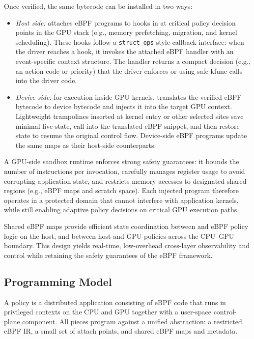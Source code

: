 Once verified, the same bytecode can be installed in two ways:

\begin{itemize}[leftmargin=*]
  \item \emph{Host side:} \sys attaches eBPF programs to hooks in \sysdriver at critical policy decision points in the GPU stack (e.g., memory prefetching, migration, and kernel scheduling). These hooks follow a \texttt{struct\_ops}-style callback interface: when the driver reaches a hook, it invokes the attached eBPF handler with an event-specific context structure. The handler returns a compact decision (e.g., an action code or priority) that the driver enforces or using safe kfunc calls into the driver code.
  \item \emph{Device side:} for execution inside GPU kernels, \sys translates the verified eBPF bytecode to device bytecode and injects it into the target GPU context. Lightweight trampolines inserted at kernel entry or other selected sites save minimal live state, call into the translated eBPF snippet, and then restore state to resume the original control flow. Device-side eBPF programs update the same maps as their host-side counterparts.
\end{itemize}

A GPU-side sandbox runtime enforces strong safety guarantees: it bounds the number of instructions per invocation, carefully manages register usage to avoid corrupting application state, and restricts memory accesses to designated shared regions (e.g., eBPF maps and scratch space). Each injected program therefore operates in a protected domain that cannot interfere with application kernels, while still enabling adaptive policy decisions on critical GPU execution paths.

Shared eBPF maps provide efficient state coordination between \sysdriver and eBPF policy logic on the host, and between host and GPU policies across the CPU--GPU boundary. This design yields real-time, low-overhead cross-layer observability and control while retaining the safety guarantees of the eBPF framework.

\subsection{\sys Programming Model}
\label{sec:prog-model}

A \sys policy is a distributed application consisting of eBPF code that runs in
privileged contexts on the CPU and GPU together with a user-space control-plane
component. All pieces program against a unified abstraction: a restricted eBPF IR,
a small set of attach points, and shared eBPF maps and metadata.

